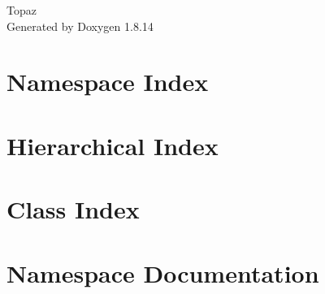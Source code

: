 \documentclass[twoside]{book}
\newcommand{\+}{\discretionary{\mbox{\scriptsize$\hookleftarrow$}}{}{}}
\newcommand{\clearemptydoublepage}{%
  \newpage{\pagestyle{empty}\cleardoublepage}%
}
\begin{document}
\hypersetup{pageanchor=false,
             bookmarksnumbered=true,
             pdfencoding=unicode
            }
\begin{titlepage}
\vspace*{7cm}
\begin{center}%
{\Large Topaz }\\
\vspace*{1cm}
{\large Generated by Doxygen 1.8.14}\\
\end{center}
\end{titlepage}
\clearemptydoublepage
{}
\tableofcontents
\clearemptydoublepage
{}
\hypersetup{pageanchor=true}

\chapter{Namespace Index}

\chapter{Hierarchical Index}

\chapter{Class Index}

\chapter{Namespace Documentation}






\end{document}
